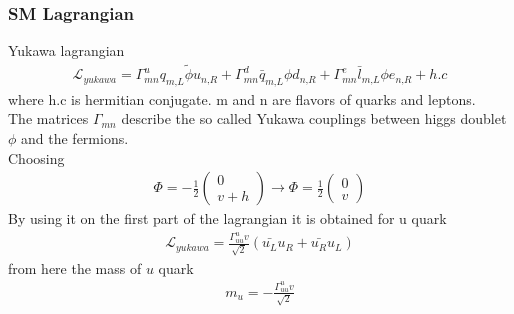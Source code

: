 \documentclass[11pt]{beamer}
\begin{document}
\begin{frame}
\frametitle{SM Lagrangian}
Yukawa lagrangian
\begin{align}
\mathcal{L}_{yukawa}=\Gamma^u_{mn}q_{m\text{,}L} \tilde{\phi} u_{n\text{,}R}+\Gamma^d_{mn}\bar{q}_{m\text{,}L} \phi d_{n\text{,}R}+\Gamma^e_{mn}\bar{l}_{m\text{,}L} \phi e_{n\text{,}R}+h.c
\end{align}
\scriptsize{where h.c is hermitian conjugate. m and n are flavors of quarks and leptons.
\\
The matrices $\Gamma_{mn}$ describe the so called Yukawa couplings between higgs doublet $\phi$ and the fermions.\\
Choosing}
\begin{align*}
\Phi=-\frac{1}{2}\left(\begin{array}{c}
0 \\
v+h
\end{array} \right) \rightarrow  \Phi=\frac{1}{2}\left(\begin{array}{c}
0 \\
v
\end{array} \right) %
\end{align*}
\scriptsize{
By using it on the first part of 
the lagrangian it is obtained for u quark} 
\begin{align*}
\mathcal{L}_{yukawa}=\frac{\Gamma^u_{uu}v}{\sqrt{2}}(\bar{u_L}u_R+\bar{u_R}u_L)
\end{align*}
\scriptsize{
from here the mass of $u$ quark}
\begin{align*}
m_u=-\frac{\Gamma^u_{uu}v}{\sqrt{2}}
\end{align*}
\end{frame}
\end{document}

